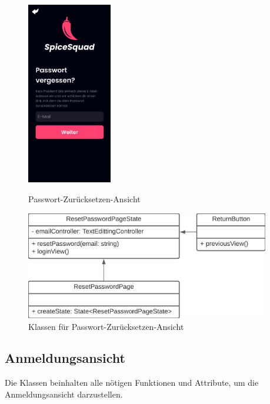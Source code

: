 \documentclass[parskip=full]{scrartcl}
\begin{document}
            \begin{figure}[htp]
                \begin{minipage}
                    [t]{0.49\textwidth}
                    \centering
                    \includegraphics[height=80mm]{images/Presentation-layer/PasswordResetView.jpg}
                    \caption{Passwort-Zurücksetzen-Ansicht}
                \end{minipage}
                \begin{minipage}
                    [t]{0.49\textwidth}
                    \centering
                    \includegraphics[width=0.95\textwidth]{images/Presentation-layer/PasswordResetViewClass.png}
                    \caption{Klassen für Passwort-Zurücksetzen-Ansicht}
                \end{minipage}
            \end{figure}    
        
            \newpage

\subsection{Anmeldungsansicht}
    Die Klassen beinhalten alle nötigen Funktionen und Attribute, um die Anmeldungsansicht darzustellen.
\end{document}
